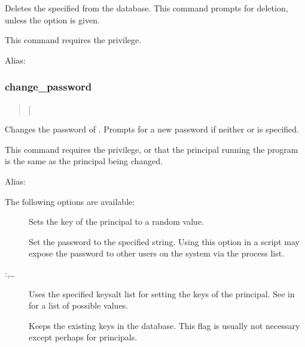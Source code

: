 \documentclass[letterpaper,10pt,english]{sphinxmanual}
\begin{document}
\sphinxAtStartPar
Deletes the specified  from the database.  This command
prompts for deletion, unless the  option is given.

\sphinxAtStartPar
This command requires the  privilege.

\sphinxAtStartPar
Alias: 


\subsubsection{change\_password}
\label{\detokenize{admin/admin_commands/kadmin_local:change-password}}\label{\detokenize{admin/admin_commands/kadmin_local:id5}}\begin{quote}

\sphinxAtStartPar
{} {[}\sphinxstyleemphasis{options}{]} 
\end{quote}

\sphinxAtStartPar
Changes the password of .  Prompts for a new password if
neither  or  is specified.

\sphinxAtStartPar
This command requires the  privilege, or that the
principal running the program is the same as the principal being
changed.

\sphinxAtStartPar
Alias: 

\sphinxAtStartPar
The following options are available:
\begin{description}
\item[{}] \leavevmode
\sphinxAtStartPar
Sets the key of the principal to a random value.

\item[{ }] \leavevmode
\sphinxAtStartPar
Set the password to the specified string.  Using this option in a
script may expose the password to other users on the system via
the process list.

\item[{ :,…}] \leavevmode
\sphinxAtStartPar
Uses the specified keysalt list for setting the keys of the
principal.  See {\hyperref[\detokenize{admin/conf_files/kdc_conf:keysalt-lists}]{}} in {\hyperref[\detokenize{admin/conf_files/kdc_conf:kdc-conf-5}]{}} for a
list of possible values.

\item[{}] \leavevmode
\sphinxAtStartPar
Keeps the existing keys in the database.  This flag is usually not
necessary except perhaps for  principals.

\end{description}
\end{document}
